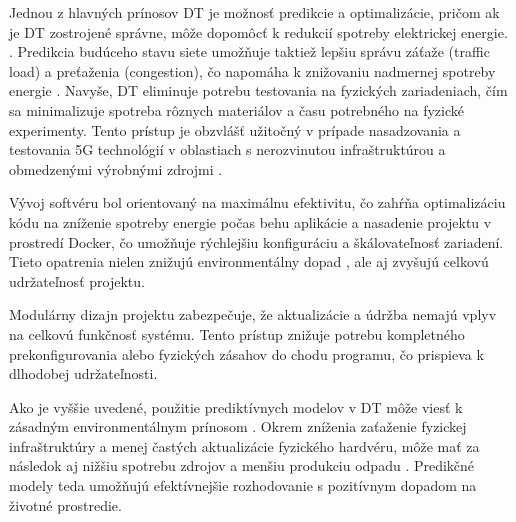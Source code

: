 \par{
Jednou z hlavných prínosov DT je možnosť predikcie a optimalizácie, pričom ak je DT zostrojené správne, môže dopomôcť k redukcií spotreby elektrickej energie. \cite{DT_edge_networks_IoT}. Predikcia budúceho stavu siete umožňuje taktiež lepšiu správu záťaže (traffic load) a preťaženia (congestion), čo napomáha k znižovaniu nadmernej spotreby energie \cite{malaysia_enviro}. Navyše, DT eliminuje potrebu testovania na fyzických zariadeniach, čím sa minimalizuje spotreba rôznych materiálov \cite{enviro_raw_materials} a času potrebného na fyzické experimenty. Tento prístup je obzvlášť užitočný v prípade nasadzovania a testovania 5G technológií v oblastiach s nerozvinutou infraštruktúrou a obmedzenými výrobnými zdrojmi \cite{huaweii_i_cities}.
}

\par{
Vývoj softvéru bol orientovaný na maximálnu efektivitu, čo zahŕňa optimalizáciu kódu na zníženie spotreby energie počas behu aplikácie a nasadenie projektu v prostredí Docker, čo umožňuje rýchlejšiu konfiguráciu a škálovateľnosť zariadení. Tieto opatrenia nielen znižujú environmentálny dopad \cite{docker_enviro}\cite{docker_enviro_2}, ale aj zvyšujú celkovú udržateľnosť projektu.
}

\par{
Modulárny dizajn \cite{modular_sw} projektu zabezpečuje, že aktualizácie a údržba nemajú vplyv na celkovú funkčnosť systému. Tento prístup znižuje potrebu kompletného prekonfigurovania alebo fyzických zásahov do chodu programu, čo prispieva k dlhodobej udržateľnosti.
}

\par{
Ako je vyššie uvedené, použitie prediktívnych modelov v DT môže viesť k zásadným environmentálnym prínosom \cite{enviro}. Okrem zníženia zaťaženie fyzickej infraštruktúry a menej častých aktualizácie fyzického hardvéru, môže mať za následok aj nižšiu spotrebu zdrojov a menšiu produkciu odpadu \cite{enviro_raw_materials}. Predikčné modely teda umožňujú efektívnejšie rozhodovanie s pozitívnym dopadom na životné prostredie.
}

